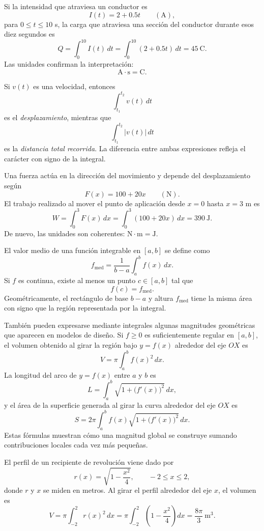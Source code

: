 \begin{example}
Si la intensidad que atraviesa un conductor es
\[
I(t)=2+0.5t\qquad (\mathrm{A}),
\]
para $0\leq t\leq10$ s, la carga que atraviesa una sección del conductor durante esos diez segundos es
\[
Q=\int_0^{10}I(t)\,dt
=
\int_0^{10}(2+0.5t)\,dt
=45\ \mathrm{C}.
\]
Las unidades confirman la interpretación:
\[
\mathrm{A}\cdot\mathrm{s}=\mathrm{C}.
\]
\end{example}

Si $v(t)$ es una velocidad, entonces
\[
\int_{t_1}^{t_2}v(t)\,dt
\]
es el \emph{desplazamiento}, mientras que
\[
\int_{t_1}^{t_2}|v(t)|\,dt
\]
es la \emph{distancia total recorrida}. La diferencia entre ambas expresiones refleja el carácter con signo de la integral.

\begin{example}
Una fuerza actúa en la dirección del movimiento y depende del desplazamiento según
\[
F(x)=100+20x\qquad (\mathrm{N}).
\]
El trabajo realizado al mover el punto de aplicación desde $x=0$ hasta $x=3$ m es
\[
W=\int_0^3F(x)\,dx
=
\int_0^3(100+20x)\,dx
=390\ \mathrm{J}.
\]
De nuevo, las unidades son coherentes: $\mathrm{N}\cdot\mathrm{m}=\mathrm{J}$.
\end{example}

El valor medio de una función integrable en $[a,b]$ se define como
\[
\boxed{f_{\mathrm{med}}=\frac1{b-a}\int_a^b f(x)\,dx.}
\]
Si $f$ es continua, existe al menos un punto $c\in[a,b]$ tal que
\[
f(c)=f_{\mathrm{med}}.
\]
Geométricamente, el rectángulo de base $b-a$ y altura $f_{\mathrm{med}}$ tiene la misma área con signo que la región representada por la integral.

También pueden expresarse mediante integrales algunas magnitudes geométricas que aparecen en modelos de diseño. Si $f\geq0$ es suficientemente regular en $[a,b]$, el volumen obtenido al girar la región bajo $y=f(x)$ alrededor del eje $OX$ es
\[
V=\pi\int_a^b f(x)^2\,dx.
\]
La longitud del arco de $y=f(x)$ entre $a$ y $b$ es
\[
L=\int_a^b\sqrt{1+\bigl(f'(x)\bigr)^2}\,dx,
\]
y el área de la superficie generada al girar la curva alrededor del eje $OX$ es
\[
S=2\pi\int_a^b f(x)\sqrt{1+\bigl(f'(x)\bigr)^2}\,dx.
\]
Estas fórmulas muestran cómo una magnitud global se construye sumando contribuciones locales cada vez más pequeñas.

\begin{example}
El perfil de un recipiente de revolución viene dado por
\[
r(x)=\sqrt{1-\frac{x^2}{4}},
\qquad -2\leq x\leq2,
\]
donde $r$ y $x$ se miden en metros. Al girar el perfil alrededor del eje $x$, el volumen es
\[
V=\pi\int_{-2}^2r(x)^2\,dx
=
\pi\int_{-2}^2\left(1-\frac{x^2}{4}\right)dx
=
\frac{8\pi}{3}\ \mathrm{m}^3.
\]
\end{example}

